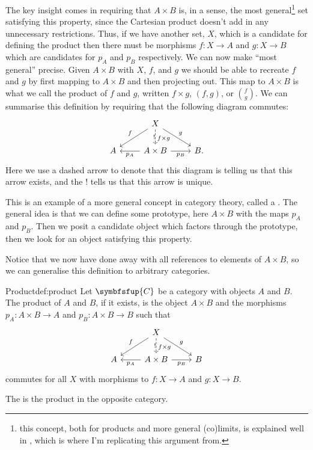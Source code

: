 \documentclass[fleqn]{NotesClass}
\newcommand{\cat}[1]{\symbfsfup{#1}}
\begin{document}
    The key insight comes in requiring that \(A \times B\) is, in a sense, the most general\footnote{this concept, both for products and more general (co)limits, is explained well in \cite{milewski}, which is where I'm replicating this argument from.} set satisfying this property, since the Cartesian product doesn't add in any unnecessary restrictions.
    Thus, if we have another set, \(X\), which is a candidate for defining the product then there must be morphisms \(f \colon X \to A\) and \(g \colon X \to B\) which are candidates for \(p_A\) and \(p_B\) respectively.
    We can now make \enquote{most general} precise.
    Given \(A \times B\) with \(X\), \(f\), and \(g\) we should be able to recreate \(f\) and \(g\) by first mapping to \(A \times B\) and then projecting out.
    This map to \(A \times B\) is what we call the product of \(f\) and \(g\), written \(f \times g\), \((f, g)\), or \(\binom{f}{g}\).
    We can summarise this definition by requiring that the following diagram commutes:
    \begin{equation}
        \begin{tikzcd}
            & X \arrow[d, "f \times g"{pos=0.6}, dashed, "!"'{xshift=0.075cm}] \arrow[dl, "f"'] \arrow[dr, "g"] & \\
            A & A \times B \arrow[l, "p_A"] \arrow[r, "p_B"'] & B.
        \end{tikzcd}
    \end{equation}
    Here we use a dashed arrow to denote that this diagram is telling us that this arrow exists, and the \(!\) tells us that this arrow is unique.
    
    This is an example of a more general concept in category theory, called a .
    The general idea is that we can define some prototype, here \(A \times B\) with the maps \(p_A\) and \(p_B\).
    Then we posit a candidate object which factors through the prototype, then we look for an object satisfying this property.
    
    Notice that we now have done away with all references to elements of \(A \times B\), so we can generalise this definition to arbitrary categories.
    
    \begin{dfn}{Product}{def:product}
        Let \(\cat{C}\) be a category with objects \(A\) and \(B\).
        The product of \(A\) and \(B\), if it exists, is the object \(A \times B\) and the morphisms \(p_A \colon A \times B \to A\) and \(p_B \colon A \times B \to B\) such that
        \begin{equation}
            \begin{tikzcd}
                & X \arrow[d, "f \times g"{pos=0.6}, dashed, "!"'{xshift=0.075cm}] \arrow[dl, "f"'] \arrow[dr, "g"] & \\
                A & A \times B \arrow[l, "p_A"] \arrow[r, "p_B"'] & B
            \end{tikzcd}
        \end{equation}
        commutes for all \(X\) with morphisms to \(f \colon X \to A\) and \(g \colon X \to B\).
        
        The  is the product in the opposite category.
    \end{dfn}
    
\end{document}
